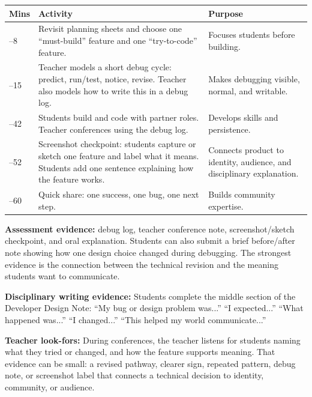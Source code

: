 \renewcommand{\arraystretch}{0.92}
\setlength{\tabcolsep}{3pt}
\begin{tabularx}{\textwidth}{|>{\raggedright\arraybackslash}p{}|Y|>{\raggedright\arraybackslash}p{0.25\textwidth}|}
\hline
{}
\textbf{Mins} & \textbf{Activity} & \textbf{Purpose} \\ --8 & Revisit planning sheets and choose one ``must-build'' feature and one ``try-to-code'' feature. & Focuses students before building. \\ --15 & Teacher models a short debug cycle: predict, run/test, notice, revise. \textcolor{LessonTwoAccent}{Teacher also models how to write this in a debug log.} & Makes debugging visible, normal, and writable. \\ --42 & Students build and code with partner roles. Teacher conferences using the debug log. & Develops skills and persistence. \\ --52 & Screenshot checkpoint: students capture or sketch one feature and label what it means. \textcolor{LessonTwoAccent}{Students add one sentence explaining how the feature works.} & Connects product to identity, audience, and disciplinary explanation. \\ --60 & Quick share: one success, one bug, one next step. & Builds community expertise. \\ \hline
\end{tabularx}

\textbf{Assessment evidence:} debug log, teacher conference note, screenshot/sketch checkpoint, and oral explanation. Students can also submit a brief before/after note showing how one design choice changed during debugging. The strongest evidence is the connection between the technical revision and the meaning students want to communicate.

\textcolor{LessonTwoAccent}{\textbf{Disciplinary writing evidence:} Students complete the middle section of the Developer Design Note: ``My bug or design problem was...'' ``I expected...'' ``What happened was...'' ``I changed...'' ``This helped my world communicate...''}

\textbf{Teacher look-fors:} During conferences, the teacher listens for students naming what they tried or changed, and how the feature supports meaning. That evidence can be small: a revised pathway, clearer sign, repeated pattern, debug note, or screenshot label that connects a technical decision to identity, community, or audience.

